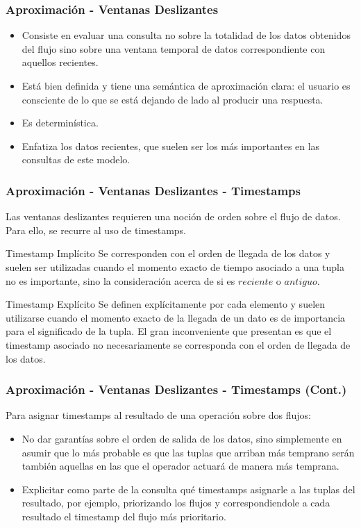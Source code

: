 \begin{frame}
\frametitle{Aproximación - Ventanas Deslizantes}
\begin{itemize}
\item Consiste en evaluar una consulta no sobre la totalidad de los datos obtenidos del flujo sino sobre una ventana temporal de datos correspondiente con aquellos recientes.
\item Está bien definida y tiene una semántica de aproximación clara: el usuario es consciente de lo que se está dejando de lado al producir una respuesta.
\item Es determinística.
\item Enfatiza los datos recientes, que suelen ser los más importantes en las consultas de este modelo.
\end{itemize}
\end{frame}

\begin{frame}
\frametitle{Aproximación - Ventanas Deslizantes - Timestamps}
Las ventanas deslizantes requieren una noción de orden sobre el flujo de datos. Para ello, se recurre al uso de timestamps.
\begin{block}{Timestamp Implícito}
Se corresponden con el orden de llegada de los datos y suelen ser utilizadas cuando el momento exacto de tiempo asociado a una tupla no es importante, sino la consideración acerca de si es $reciente$ o $antiguo$.
\end{block}

\begin{block}{Timestamp Explícito}
 Se definen explícitamente por cada elemento y suelen utilizarse cuando el momento exacto de la llegada de un dato es de importancia para el significado de la tupla. El gran inconveniente que presentan es que el timestamp asociado no necesariamente se corresponda con el orden de llegada de los datos.
\end{block}
\end{frame}

\begin{frame}
\frametitle{Aproximación - Ventanas Deslizantes - Timestamps (Cont.)}
Para asignar timestamps al resultado de una operación sobre dos flujos:
\begin{itemize}
\item No dar garantías sobre el orden de salida de los datos, sino simplemente en asumir que lo más probable es que las tuplas que arriban más temprano serán también aquellas en las que el operador actuará de manera más temprana.
\item Explicitar como parte de la consulta qué timestamps asignarle a las tuplas del resultado, por ejemplo, priorizando los flujos y correspondiendole a cada resultado el timestamp del flujo más prioritario.
\end{itemize}
\end{frame}

